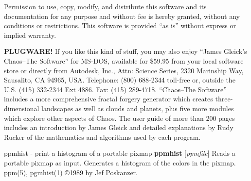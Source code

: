 \par
Permission to use, copy, modify, and distribute this software and its
documentation for any purpose and without fee is hereby granted,
without any conditions or restrictions.  This software is provided ``as
is'' without express or implied warranty.
\par
{\bf PLUGWARE!}
If you like this kind of stuff, you may also enjoy ``James Gleick's
Chaos--The Software'' for MS-DOS, available for \$59.95 from your
local software store or directly from Autodesk, Inc., Attn: Science
Series, 2320 Marinship Way, Sausalito, CA 94965, USA.  Telephone:
(800) 688-2344 toll-free or, outside the U.S. (415) 332-2344 Ext
4886.  Fax: (415) 289-4718.  ``Chaos--The Software'' includes a more
comprehensive fractal forgery generator which creates
three-dimensional landscapes as well as clouds and planets, plus five
more modules which explore other aspects of Chaos.  The user guide of
more than 200 pages includes an introduction by James Gleick and
detailed explanations by Rudy Rucker of the mathematics and algorithms
used by each program.
%
 
%

\newpage
%

ppmhist - print a histogram of a portable pixmap
{\bf ppmhist}
{\rm [}{\it ppmfile}{\rm ]}
Reads a portable pixmap as input.
Generates a histogram of the colors in the pixmap.
ppm(5), pgmhist(1)
\copyright 1989 by Jef Poskanzer.
%
 
